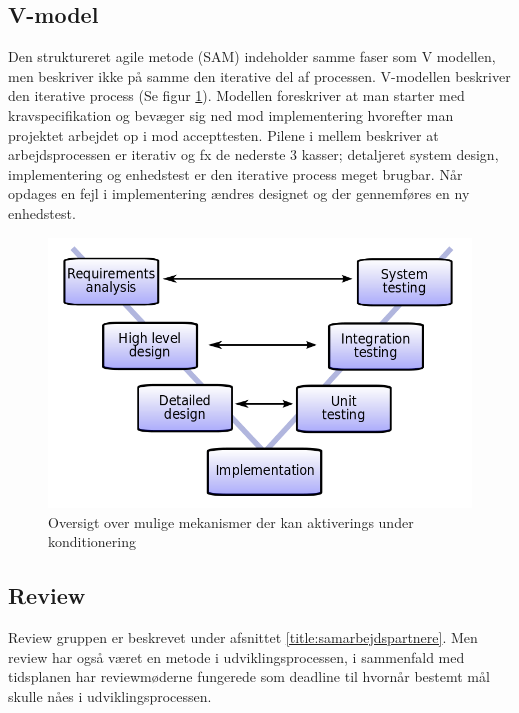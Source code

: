 \subsection{V-model}
Den struktureret agile metode (SAM) indeholder samme faser som V modellen, men beskriver ikke på samme den iterative del af processen. V-modellen beskriver den iterative process (Se figur \ref{fig:vmodel}). Modellen foreskriver at man starter med kravspecifikation og bevæger sig ned mod implementering hvorefter man projektet arbejdet op i mod accepttesten. Pilene i mellem beskriver at arbejdsprocessen er iterativ og fx de nederste 3 kasser; detaljeret system design, implementering og enhedstest er den iterative process meget brugbar. Når opdages en fejl i implementering ændres designet og der gennemføres en ny enhedstest.  
\begin{figure}[H]
	\includegraphics[width = \textwidth]{billeder/vmodel.png}
	\caption{Oversigt over mulige mekanismer der kan aktiverings under konditionering}\label{fig:vmodel}
\end{figure}

\subsection{Review}
Review gruppen er beskrevet under afsnittet \ref{title:samarbejdspartnere}. Men review har også været en metode i udviklingsprocessen, i sammenfald med tidsplanen har reviewmøderne fungerede som deadline til hvornår bestemt mål skulle nåes i udviklingsprocessen. 
